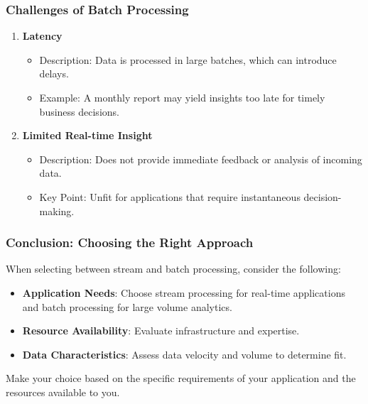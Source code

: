 \documentclass{beamer}
\begin{document}
\begin{frame}[fragile]
    \frametitle{Challenges of Batch Processing}
    \begin{enumerate}
        \item \textbf{Latency}
        \begin{itemize}
            \item Description: Data is processed in large batches, which can introduce delays.
            \item Example: A monthly report may yield insights too late for timely business decisions.
        \end{itemize}
        \item \textbf{Limited Real-time Insight}
        \begin{itemize}
            \item Description: Does not provide immediate feedback or analysis of incoming data.
            \item Key Point: Unfit for applications that require instantaneous decision-making.
        \end{itemize}
    \end{enumerate}
\end{frame}

\begin{frame}[fragile]
    \frametitle{Conclusion: Choosing the Right Approach}
    When selecting between stream and batch processing, consider the following:
    \begin{itemize}
        \item \textbf{Application Needs}: Choose stream processing for real-time applications and batch processing for large volume analytics.
        \item \textbf{Resource Availability}: Evaluate infrastructure and expertise.
        \item \textbf{Data Characteristics}: Assess data velocity and volume to determine fit.
    \end{itemize}
    Make your choice based on the specific requirements of your application and the resources available to you.
\end{frame}
\end{document}
